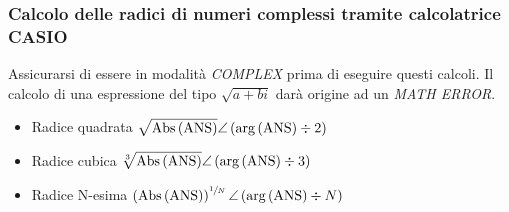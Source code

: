 \documentclass{article}
\begin{document}
\subsubsection{Calcolo delle radici di numeri complessi tramite calcolatrice CASIO}
Assicurarsi di essere in modalità \textit{COMPLEX} prima di eseguire questi calcoli. Il calcolo di una espressione del tipo \(\sqrt{a+bi}\) darà origine ad un \textit{MATH ERROR}.
\begin{itemize}
	\item Radice quadrata \( \displaystyle \sqrt{ \textnormal{Abs} \left( \textnormal{ANS} \right) } \angle \left( \textnormal{arg} \left( \textnormal{ANS} \right) \div 2 \right) \)
	\item Radice cubica \( \displaystyle \sqrt[3]{ \textnormal{Abs} \left( \textnormal{ANS} \right) } \angle \left( \textnormal{arg} \left( \textnormal{ANS} \right) \div 3 \right) \)
	\item Radice N-esima \(  \left( \textnormal{Abs} \left( \textnormal{ANS} \right) \right) ^ {\sfrac{1}{N}} \angle \left(\textnormal{arg} \left( \textnormal{ANS} \right) \div N \right)\)
\end{itemize}

\newpage 
\end{document}
